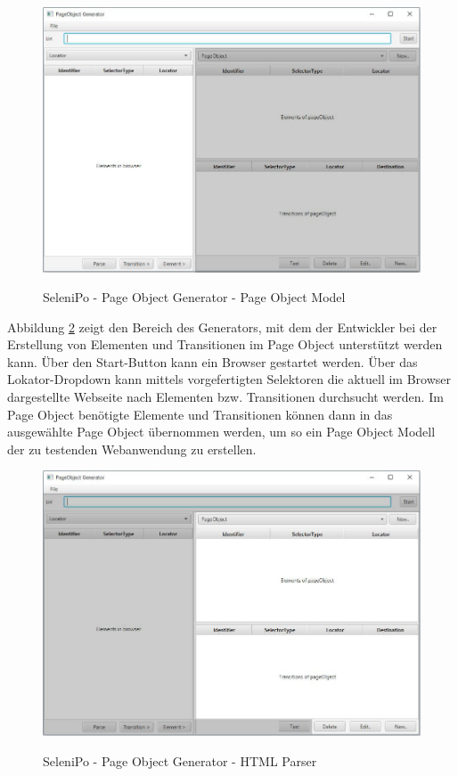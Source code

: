 \begin{figure}[htb]
  \centering  
  \includegraphics[scale=0.5]{img/poGeneratorPo.JPG}\\
  \caption{SeleniPo - Page Object Generator - Page Object Model}
  \label{fig:poGeneratorPo}
\end{figure}

\newpage

Abbildung \ref{fig:poGeneratorHtml} zeigt den Bereich des Generators, mit dem der Entwickler bei der Erstellung von Elementen und Transitionen im Page Object unterstützt werden kann.
Über den Start-Button kann ein Browser gestartet werden. Über das Lokator-Dropdown kann mittels vorgefertigten Selektoren die aktuell im Browser dargestellte Webseite nach Elementen bzw. Transitionen durchsucht werden. Im Page Object benötigte Elemente und Transitionen können dann in das ausgewählte Page Object übernommen werden, um so ein Page Object Modell der zu testenden Webanwendung zu erstellen.

\begin{figure}[htb]
  \centering  
  \includegraphics[scale=0.5]{img/poGeneratorHtml.JPG}\\
  \caption{SeleniPo - Page Object Generator - HTML Parser}
  \label{fig:poGeneratorHtml}
\end{figure}

